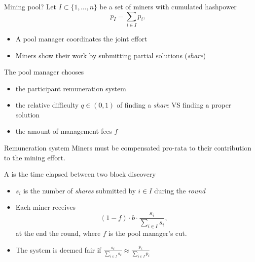 \documentclass{beamer}
\begin{document}
\begin{frame}{Mining pool?}
\scriptsize
Let $I\subset\{1,\ldots, n\}$ be a set of miners with cumulated hashpower
$$
p_I = \sum_{i\in I }p_i,
$$
\begin{itemize}
  \item A pool manager coordinates the joint effort
  \item Miners show their work by submitting partial solutions (\textit{share})  
\end{itemize}
The pool manager chooses
\begin{itemize} 
  \item the participant remuneration system
  \item the relative difficulty $q\in(0,1)$ of finding a \textit{share} VS finding a proper solution
  \item the amount of management fees $f$
  \end{itemize} 
\end{frame}
\begin{frame}{Remuneration system}
\scriptsize
Miners must be compensated pro-rata to their contribution to the mining effort. 
\begin{tcolorbox}[enhanced,drop shadow, title=Proportional scheme]
A  is the time elapsed between two block discovery 
\begin{itemize} 
  \item $s_i$ is the number of \textit{shares} submitted by $i\in I$ during the \textit{round}
  \item Each miner receives 
  $$
  (1-f)\cdot b\cdot\frac{s_i}{\sum_{i\in I}s_i},
  $$
  at the end the round, where $f$ is the pool manager's cut.
  \item The system is deemed fair if $\frac{s_i}{\sum_{i\in I}s_i}\approx\frac{p_i}{\sum_{i\in I}p_i}$
\end{itemize}

\end{tcolorbox}
\end{frame}
\end{document}
